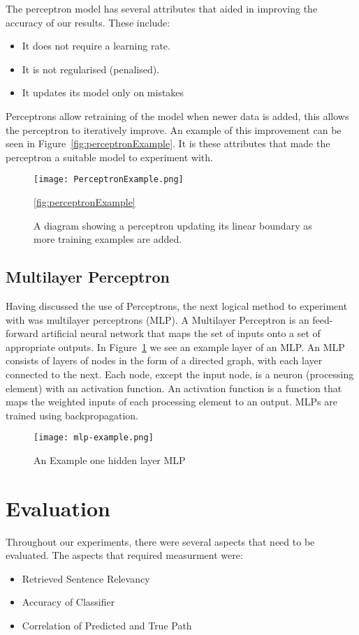 \documentclass[bsc,frontabs,twoside,singlespacing,parskip,deptreport]{infthesis}     %
\begin{document}
The perceptron model has several attributes that aided in improving the accuracy of our results.
These include:
\begin{itemize}
\item It does not require a learning rate.
\item It is not regularised (penalised).
\item It updates its model only on mistakes
\end{itemize}

Perceptrons allow retraining of the model when newer data is added, this allows the perceptron to
iteratively improve. An example of this improvement can be seen in Figure~\ref{fig:perceptronExample}.
It is these attributes that made the perceptron a suitable model to experiment with.
\begin{figure}[ht]
  \centering
  \texttt{[image: PerceptronExample.png]}
  \caption{A diagram showing a perceptron updating its linear boundary as more training examples are added. }
  \ref{fig:perceptronExample}
\end{figure}

\subsection{Multilayer Perceptron}
Having discussed the use of Perceptrons, the next logical method to experiment with was multilayer perceptrons (MLP).
A Multilayer Perceptron is an feed-forward artificial neural network that maps the set of inputs
onto a set of appropriate outputs.
In Figure~\ref{fig:mlp} we see an example layer of an MLP.
An MLP consists of layers of  nodes in the form of a directed graph, with each layer connected to the next.
Each node, except the input node, is a neuron (processing element) with an activation function.%
An activation function is a function that maps the weighted inputs of each processing element to an output.
MLPs are trained using backpropagation.

\begin{figure}
  \centering
  \texttt{[image: mlp-example.png]}
  \caption{An Example one hidden layer MLP \cite{scikit-learn}}
  \label{fig:mlp}
\end{figure}

\section{Evaluation}
Throughout our experiments, there were several aspects that need to be evaluated.
The aspects that required measurment were:
\begin{itemize}
  \item Retrieved Sentence Relevancy
  \item Accuracy of Classifier
  \item Correlation of Predicted and True Path
\end{itemize}
\end{document}
